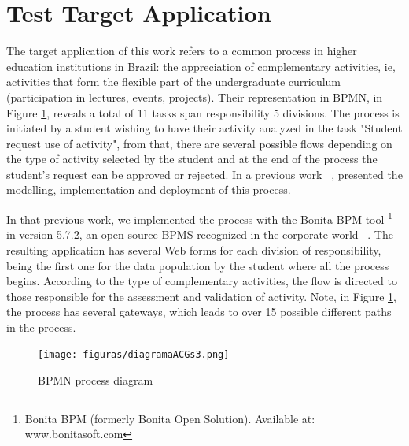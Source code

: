 \documentclass[runningheads,a4paper]{llncs}
\begin{document}
\section{Test Target Application}\label{s:apli}


The target application of this work refers to a common process in higher education institutions in Brazil: the appreciation of complementary activities, ie, activities that form the flexible part of the undergraduate curriculum (participation in lectures, events, projects). Their representation in BPMN, in Figure \ref{fig:diagrama}, reveals a total of 11 tasks span responsibility 5 divisions. The process is initiated by a student wishing to have their activity analyzed in the task "Student request use of activity", from that, there are several possible flows depending on the type of activity selected by the student and at the end of the process the student's request can be approved or rejected. In a previous work ~\cite{sbsi2013}, presented the modelling, implementation and deployment of this process. 

In that previous work, we implemented the process with the Bonita BPM tool \footnote{Bonita BPM (formerly Bonita Open Solution). Available at: www.bonitasoft.com} in version 5.7.2, an open source BPMS recognized in the corporate world ~\cite{forrester}. The resulting application has several Web forms for each division of responsibility, being the first one for the data population by the student where all the process begins. According to the type of complementary activities, the flow is directed to those responsible for the assessment and validation of activity. Note, in Figure \ref{fig:diagrama}, the process has several gateways, which leads to over 15 possible different paths in the process.



\begin{figure}[ht]
\centering
\texttt{[image: figuras/diagramaACGs3.png]}
\caption{BPMN process diagram}
\label{fig:diagrama}
\end{figure}
\end{document}
